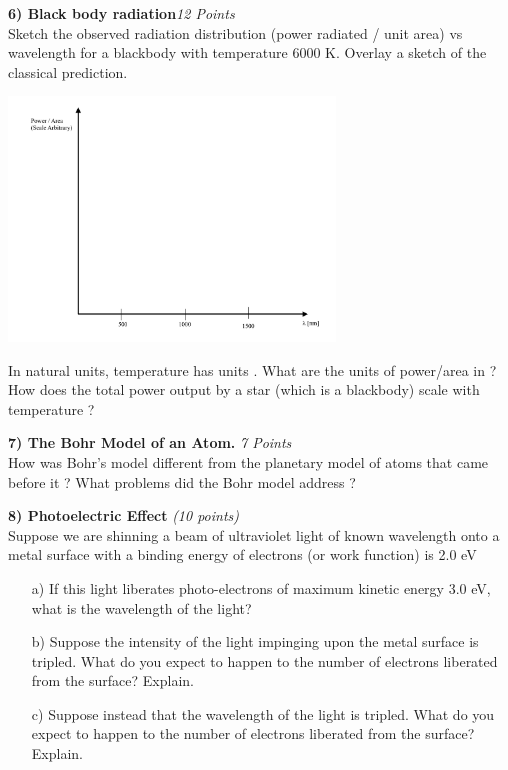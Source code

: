 {\clearpage


\textbf{6) Black body radiation}\hfill \textit{12 Points}\\
Sketch the observed radiation distribution (power radiated / unit area) vs wavelength for a blackbody with temperature 6000 K.
Overlay a sketch of the classical prediction.

\begin{center}
\includegraphics[width=0.65\textwidth]{./Axes.pdf}
\end{center}

In natural units, temperature has units \GeV.  What are the units of power/area in \GeV ? How does the total power output by a star (which is a blackbody) scale with temperature ?

\vspace{1.25in}

\begin{minipage}{\textwidth}
\textbf{7) The Bohr Model of an Atom. }\hfill \textit{7 Points}\\
How was Bohr's model different from the planetary model of atoms that came before it ?
What problems did the Bohr model address ?
\end{minipage}

\vspace{3.25in}


\clearpage

\textbf{8) Photoelectric Effect }\hfill \textit{(10 points)}\\

Suppose we are shinning a beam of ultraviolet light of known wavelength onto a metal surface with a binding energy of electrons (or work function) is 2.0 eV

\begin{itemize}
\item[a)] If this light liberates photo-electrons of maximum kinetic energy 3.0 eV, what is the wavelength of the light?
\vfill
\item[b)] Suppose the intensity of the light impinging upon the metal surface is tripled. What do you expect to happen to the number of electrons liberated from the surface? Explain.
\vfill
\item[c)] Suppose instead that the wavelength of the light is tripled. What do you expect to happen to the number of electrons liberated from the surface? Explain.
\vfill
\end{itemize}

}
